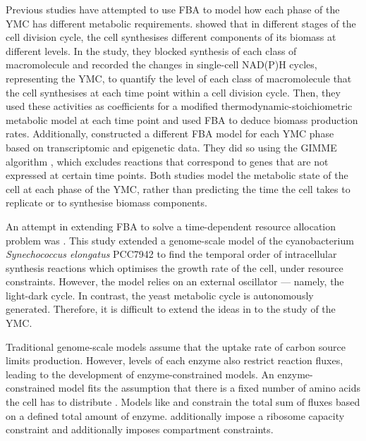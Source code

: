 Previous studies have attempted to use FBA to model how each phase of the YMC has different metabolic requirements.
\textcite{takhaveevTemporalSegregationBiosynthetic2023} showed that in different stages of the cell division cycle, the cell synthesises different components of its biomass at different levels.
In the study, they blocked synthesis of each class of macromolecule and recorded the changes in single-cell NAD(P)H cycles, representing the YMC, to quantify the level of each class of macromolecule that the cell synthesises at each time point within a cell division cycle.
Then, they used these activities as coefficients for a modified thermodynamic-stoichiometric metabolic model at each time point and used FBA to deduce biomass production rates.
Additionally, \textcite{cesurGenomeWideAnalysisYeast} constructed a different FBA model for each YMC phase based on transcriptomic and epigenetic data.
They did so using the GIMME algorithm \parencite{beckerContextSpecificMetabolicNetworks2008}, which excludes reactions that correspond to genes that are not expressed at certain time points.
Both studies model the metabolic state of the cell at each phase of the YMC, rather than predicting the time the cell takes to replicate or to synthesise biomass components.

An attempt in extending FBA to solve a time-dependent resource allocation problem was \textcite{reimersCellularTradeoffsOptimal2017}.
This study extended a genome-scale model of the cyanobacterium \textit{Synechococcus elongatus} PCC7942 to find the temporal order of intracellular synthesis reactions which optimises the growth rate of the cell, under resource constraints.
However, the model relies on an external oscillator --- namely, the light-dark cycle.
In contrast, the yeast metabolic cycle is autonomously generated.
Therefore, it is difficult to extend the ideas in \textcite{reimersCellularTradeoffsOptimal2017} to the study of the YMC.

Traditional genome-scale models assume that the uptake rate of carbon source limits production.
However, levels of each enzyme also restrict reaction fluxes, leading to the development of enzyme-constrained models.
An enzyme-constrained model fits the assumption that there is a fixed number of amino acids the cell has to distribute \parencite{weisseMechanisticLinksCellular2015}.
Models like \textcite{sanchezImprovingPhenotypePredictions2017} and \textcite{elsemmanWholecellModelingYeast2022} constrain the total sum of fluxes based on a defined total amount of enzyme.
\textcite{elsemmanWholecellModelingYeast2022} additionally impose a ribosome capacity constraint and additionally imposes compartment constraints.


